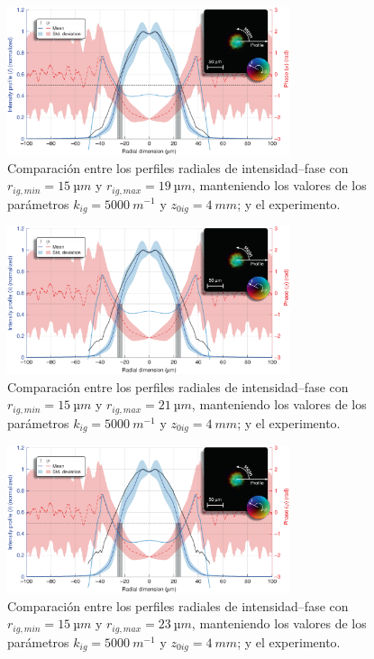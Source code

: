 \begin{figure}[htbp]
  \centering
  \includegraphics[width=0.74\textwidth]{Figuras/anx_cmp_53.png}
  \caption*{Comparación entre los perfiles radiales de intensidad--fase con $r_{ig,min}=\qty{15}{µm}$ y $r_{ig,max}=\qty{19}{µm}$, manteniendo los valores de los parámetros $k_{ig}=\qty{5000}{m^{-1}}$ y $z_{0ig}=\qty{4}{mm}$; y el experimento.}
\end{figure}

\begin{figure}[htbp]
  \centering
  \includegraphics[width=0.74\textwidth]{Figuras/anx_cmp_54.png}
  \caption*{Comparación entre los perfiles radiales de intensidad--fase con $r_{ig,min}=\qty{15}{µm}$ y $r_{ig,max}=\qty{21}{µm}$, manteniendo los valores de los parámetros $k_{ig}=\qty{5000}{m^{-1}}$ y $z_{0ig}=\qty{4}{mm}$; y el experimento.}
\end{figure}

\begin{figure}[htbp]
  \centering
  \includegraphics[width=0.74\textwidth]{Figuras/anx_cmp_55.png}
  \caption*{Comparación entre los perfiles radiales de intensidad--fase con $r_{ig,min}=\qty{15}{µm}$ y $r_{ig,max}=\qty{23}{µm}$, manteniendo los valores de los parámetros $k_{ig}=\qty{5000}{m^{-1}}$ y $z_{0ig}=\qty{4}{mm}$; y el experimento.}
\end{figure}


